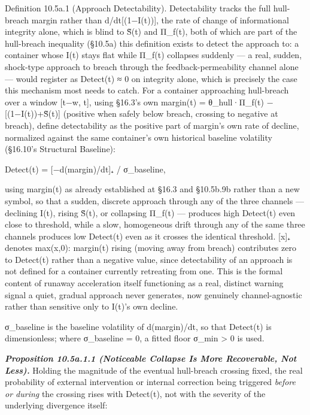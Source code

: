 \documentclass[
]{article}
\begin{document}
Definition 10.5a.1 (Approach Detectability). Detectability tracks the
full hull-breach margin rather than d/dt{[}(1−I(t)){]}, the rate of
change of informational integrity alone, which is blind to S̃(t) and
Π\_f(t), both of which are part of the hull-breach inequality (§10.5a)
this definition exists to detect the approach to: a container whose I(t)
stays flat while Π\_f(t) collapses suddenly --- a real, sudden,
shock-type approach to breach through the feedback-permeability channel
alone --- would register as Detect(t) ≈ 0 on integrity alone, which is
precisely the case this mechanism most needs to catch. For a container
approaching hull-breach over a window {[}t−w, t{]}, using §16.3's own
margin(t) = θ\_hull·Π\_f(t) − {[}(1−I(t))+S̃(t){]} (positive when safely
below breach, crossing to negative at breach), define detectability as
the positive part of margin's own rate of decline, normalized against
the same container's own historical baseline volatility (§16.10's
Structural Baseline):

Detect(t) = {[}−d(margin)/dt{]}₊ / σ\_baseline,

using margin(t) as already established at §16.3 and §10.5b.9b rather
than a new symbol, so that a sudden, discrete approach through any of
the three channels --- declining I(t), rising S̃(t), or collapsing
Π\_f(t) --- produces high Detect(t) even close to threshold, while a
slow, homogeneous drift through any of the same three channels produces
low Detect(t) even as it crosses the identical threshold. {[}x{]}₊
denotes max(x,0): margin(t) rising (moving away from breach) contributes
zero to Detect(t) rather than a negative value, since detectability of
an approach is not defined for a container currently retreating from
one. This is the formal content of runaway acceleration itself
functioning as a real, distinct warning signal a quiet, gradual approach
never generates, now genuinely channel-agnostic rather than sensitive
only to I(t)'s own decline.

σ\_baseline is the baseline volatility of d(margin)/dt, so that
Detect(t) is dimensionless; where σ\_baseline = 0, a fitted floor σ\_min
\textgreater{} 0 is used.

\emph{\textbf{Proposition 10.5a.1.1 (Noticeable Collapse Is More
Recoverable, Not Less).}} Holding the magnitude of the eventual
hull-breach crossing fixed, the real probability of external
intervention or internal correction being triggered \emph{before or
during} the crossing rises with Detect(t), not with the severity of the
underlying divergence itself:
\end{document}
